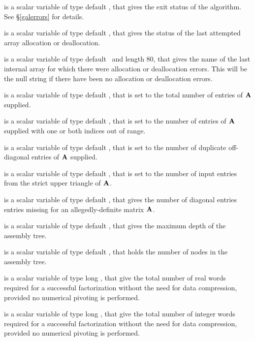 \documentclass{galahad}
\begin{document}
\begin{description}

 is a scalar variable of type default \integer, that gives the
exit status of the algorithm.
See \S\ref{galerrors}
for details.

 is a scalar variable of type default \integer, that gives
the status of the last attempted array allocation or deallocation.

 is a scalar variable of type default \character\
and length 80, that  gives the name of the last internal array
for which there were allocation or deallocation errors.
This will be the null string if there have been no
allocation or deallocation errors.


 is a scalar variable of type default \integer,
that is set to the total number of entries of ${\mathbf{A}}$ supplied.

 is a scalar variable of type default \integer,
that is set to the number of
entries of ${\mathbf{A}}$ supplied with one or both indices out of range.

 is a scalar variable of type default \integer,
that is set to the number of duplicate off-diagonal entries of ${\mathbf{A}}$ supplied.

 is a scalar variable of type default \integer,
that is set to the number of input entries from the strict upper triangle
of ${\mathbf{A}}$.

 is a scalar variable of type default \integer,
that gives the number of diagonal entries entries missing for an
allegedly-definite matrix ${\mathbf{A}}$.

 is a scalar variable of type default \integer,
that gives the maximum depth of the assembly tree.

 is a scalar variable of type default \integer,
that holds the number of nodes in the assembly tree.

 is a scalar variable of type long \integer,
that give the total number of real words required for a
successful factorization without the need for data compression,
provided no numerical pivoting is performed.

 is a scalar variable of type long \integer,
that give the total number of integer words required for a
successful factorization without the need for data compression,
provided no numerical pivoting is performed.


\end{description}
\end{document}
